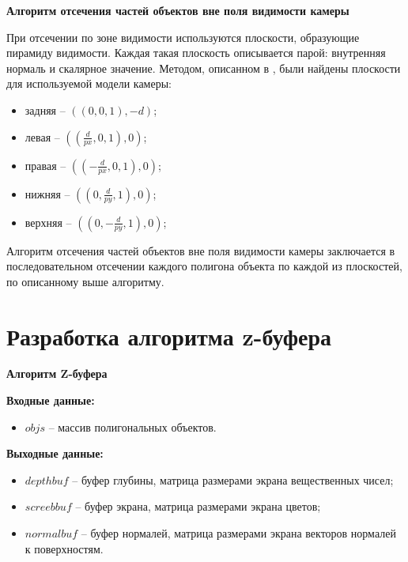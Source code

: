 \textbf{Алгоритм отсечения частей объектов вне поля видимости камеры}

При отсечении по зоне видимости используются плоскости, образующие пирамиду видимости. Каждая такая плоскость описывается парой: внутренняя нормаль и скалярное значение. Методом, описанном в \cite{gabriella}, были найдены плоскости для используемой модели камеры:
	
\begin{itemize}
	\item задняя -- $((0, 0, 1), -d)$;
	\item левая -- $((\frac{d}{px}, 0, 1), 0)$;
	\item правая -- $((-\frac{d}{px}, 0, 1), 0)$;
	\item нижняя -- $((0, \frac{d}{py}, 1), 0)$;
	\item верхняя -- $((0, -\frac{d}{py}, 1), 0)$;
\end{itemize}

Алгоритм отсечения частей объектов вне поля видимости камеры заключается в последовательном отсечении каждого полигона объекта по каждой из плоскостей, по описанному выше алгоритму.


\section{Разработка алгоритма z-буфера}

\textbf{Алгоритм Z-буфера}

\textbf{Входные данные:}
\begin{itemize}
	\item $objs$ -- массив полигональных объектов.
\end{itemize}

\textbf{Выходные данные:}
\begin{itemize}
	\item $depthbuf$ -- буфер глубины, матрица размерами экрана вещественных чисел;
	\item $screebbuf$ -- буфер экрана, матрица размерами экрана цветов;
	\item $normalbuf$ -- буфер нормалей, матрица размерами экрана векторов нормалей к поверхностям.
\end{itemize}

